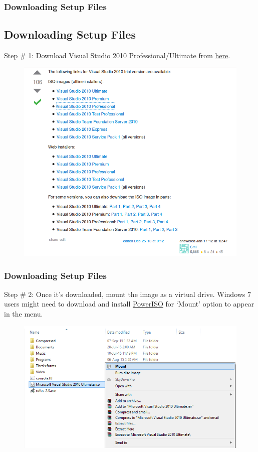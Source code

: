 \documentclass{beamer}
\begin{document}
\begin{frame}
    \frametitle{Downloading Setup Files}
    \subsection{Downloading Setup Files} %
    \label{sub:downloading_setup_files}
    Step \# 1: Download Visual Studio 2010 Professional/Ultimate from \href{http://stackoverflow.com/questions/8894654/vs-2010-trial-version-link}{here}.
    \begin{figure}
        \centering
        \includegraphics[scale=0.3]{step_0}
    \end{figure}
\end{frame}

\begin{frame}
    \frametitle{Downloading Setup Files}
    Step \# 2: Once it's downloaded, mount the image as a virtual drive. Windows 7 users might need to download and install \href{http://www.poweriso.com/download.php}{PowerISO} for `Mount' option to appear in the menu.
    \begin{figure}
        \centering
        \includegraphics[scale=0.52]{step_0_1}
    \end{figure}
\end{frame}
\end{document}
